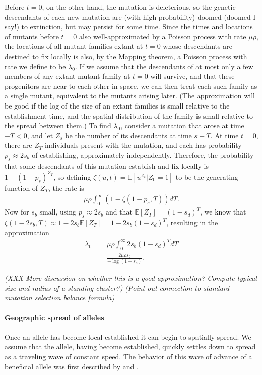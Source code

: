 \documentclass{article}
\newcommand{\gc}[1]{{\it\color{green}(#1)} }
\newcommand{\plr}[1]{{\it\color{blue}(#1)}}
\newcommand{\E}{\mathbb{E}}
\begin{document}
Before $t=0$, on the other hand, the mutation is deleterious, so the
genetic descendants of each new mutation are (with high probability)
doomed (doomed I say!) to extinction,
but may persist for some time.
Since the times and locations of mutants before $t=0$ also well-approximated by a Poisson process with rate $\mu \rho$,
the locations of all mutant families extant at $t=0$ whose descendants are destined to fix locally is also,
by the Mapping theorem, a Poisson process with rate we define to be $\lambda_0$.
If we assume that the descendants of at most only a few members of any extant mutant family at $t=0$ will survive,
and that these progenitors are near to each other in space, we can then treat each such family as a single mutant,
equivalent to the mutants arising later.
(The approximation will be good if the log of the size of an extant families is small relative to the establishment time,
and the spatial distribution of the family is small relative to the spread between them.)
To find $\lambda_0$, consider a mutation that arose at time $-T<0$, and let $Z_s$ be the number of its descendants at time $s-T$.
At time $t=0$, there are $Z_T$ individuals present with the mutation,
and each has probability $p_s \approx 2s_b$ of establishing, approximately independently.
Therefore, the probability that some descendants of this mutation establish and fix locally is $1-(1-p_s)^{Z_T}$,
so defining $\zeta(u,t) = \E[u^{Z_t} | Z_0=1 ]$ to be the generating function of $Z_T$,
the rate is
\begin{align*}
    \mu \rho \int_0^\infty \left( 1- \zeta(1-p_s,T) \right) dT .
\end{align*}
Now for $s_b$ small, using $p_s \approx 2s_b$ and that $\E[Z_T]=(1-s_d)^T$,
we know that $\zeta(1-2s_b,T) \approx 1-2s_b \E[Z_T] = 1-2s_b (1-s_d)^T$,
resulting in the approximation
\begin{align}
    \lambda_0 &= \mu \rho \int_0^\infty 2s_b (1-s_d)^{T} dT \\
        &= \frac{ 2 \mu \rho s_b }{ -\log(1-s_d) } .
\end{align}


\plr{XXX More discussion on whether this is a good approximation?  
Compute typical size and radius of a standing cluster?}
\gc{Point out connection to standard mutation selection balance formula}


\paragraph{Geographic spread of alleles} 
Once an allele has become local established it can begin to spatially spread. 
We assume that the allele, having become established, quickly settles
down to spread as a traveling wave of constant speed. The behavior of
this wave of advance of a beneficial allele was first described by 
\citet{fisher1937wave} and \citet*{KPP1937}. 
\end{document}
